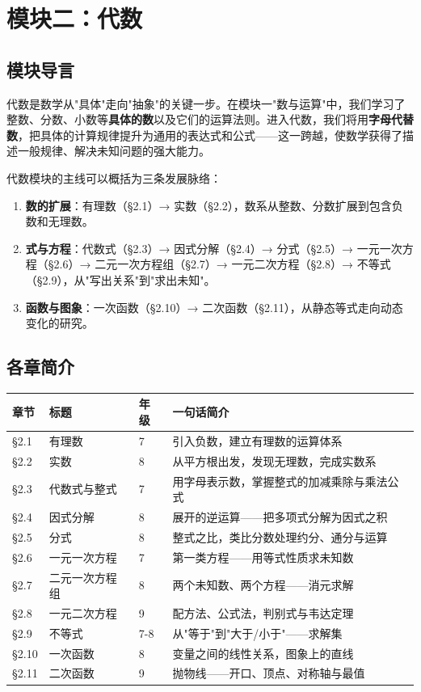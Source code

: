 \chapter*{模块二：代数}




\section*{模块导言}


代数是数学从"具体"走向"抽象"的关键一步。在模块一"数与运算"中，我们学习了整数、分数、小数等\textbf{具体的数}以及它们的运算法则。进入代数，我们将用\textbf{字母代替数}，把具体的计算规律提升为通用的表达式和公式——这一跨越，使数学获得了描述一般规律、解决未知问题的强大能力。

代数模块的主线可以概括为三条发展脉络：

\begin{enumerate}
  \item \textbf{数的扩展}：有理数（§2.1）→ 实数（§2.2），数系从整数、分数扩展到包含负数和无理数。
  \item \textbf{式与方程}：代数式（§2.3）→ 因式分解（§2.4）→ 分式（§2.5）→ 一元一次方程（§2.6）→ 二元一次方程组（§2.7）→ 一元二次方程（§2.8）→ 不等式（§2.9），从"写出关系"到"求出未知"。
  \item \textbf{函数与图象}：一次函数（§2.10）→ 二次函数（§2.11），从静态等式走向动态变化的研究。
\end{enumerate}


\section*{各章简介}


\begin{center}
\begin{tabular}{llll}
\toprule
章节 & 标题 & 年级 & 一句话简介 \\
\midrule
§2.1 & 有理数 & 7 & 引入负数，建立有理数的运算体系 \\
§2.2 & 实数 & 8 & 从平方根出发，发现无理数，完成实数系 \\
§2.3 & 代数式与整式 & 7 & 用字母表示数，掌握整式的加减乘除与乘法公式 \\
§2.4 & 因式分解 & 8 & 展开的逆运算——把多项式分解为因式之积 \\
§2.5 & 分式 & 8 & 整式之比，类比分数处理约分、通分与运算 \\
§2.6 & 一元一次方程 & 7 & 第一类方程——用等式性质求未知数 \\
§2.7 & 二元一次方程组 & 8 & 两个未知数、两个方程——消元求解 \\
§2.8 & 一元二次方程 & 9 & 配方法、公式法，判别式与韦达定理 \\
§2.9 & 不等式 & 7-8 & 从"等于"到"大于/小于"——求解集 \\
§2.10 & 一次函数 & 8 & 变量之间的线性关系，图象上的直线 \\
§2.11 & 二次函数 & 9 & 抛物线——开口、顶点、对称轴与最值 \\
\bottomrule
\end{tabular}
\end{center}


